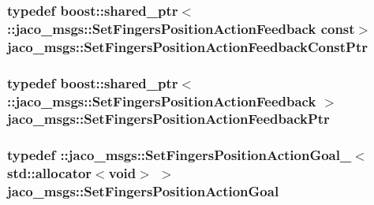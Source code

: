 \subsubsection[{\texorpdfstring{Set\+Fingers\+Position\+Action\+Feedback\+Const\+Ptr}{SetFingersPositionActionFeedbackConstPtr}}]{\setlength{\rightskip}{0pt plus 5cm}typedef boost\+::shared\+\_\+ptr$<$ \+::{\bf jaco\+\_\+msgs\+::\+Set\+Fingers\+Position\+Action\+Feedback} const$>$ {\bf jaco\+\_\+msgs\+::\+Set\+Fingers\+Position\+Action\+Feedback\+Const\+Ptr}}\hypertarget{namespacejaco__msgs_ae6320069cd389bae350b577bb3842482}{}\label{namespacejaco__msgs_ae6320069cd389bae350b577bb3842482}
\subsubsection[{\texorpdfstring{Set\+Fingers\+Position\+Action\+Feedback\+Ptr}{SetFingersPositionActionFeedbackPtr}}]{\setlength{\rightskip}{0pt plus 5cm}typedef boost\+::shared\+\_\+ptr$<$ \+::{\bf jaco\+\_\+msgs\+::\+Set\+Fingers\+Position\+Action\+Feedback} $>$ {\bf jaco\+\_\+msgs\+::\+Set\+Fingers\+Position\+Action\+Feedback\+Ptr}}\hypertarget{namespacejaco__msgs_a89d8433678d4b7ef9456c0e4ee4dee12}{}\label{namespacejaco__msgs_a89d8433678d4b7ef9456c0e4ee4dee12}
\subsubsection[{\texorpdfstring{Set\+Fingers\+Position\+Action\+Goal}{SetFingersPositionActionGoal}}]{\setlength{\rightskip}{0pt plus 5cm}typedef \+::{\bf jaco\+\_\+msgs\+::\+Set\+Fingers\+Position\+Action\+Goal\+\_\+}$<$std\+::allocator$<$void$>$ $>$ {\bf jaco\+\_\+msgs\+::\+Set\+Fingers\+Position\+Action\+Goal}}\hypertarget{namespacejaco__msgs_afb0458ba4bb87a09d2bb557f1e4351a4}{}\label{namespacejaco__msgs_afb0458ba4bb87a09d2bb557f1e4351a4}
